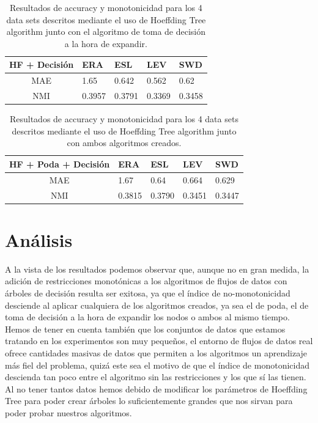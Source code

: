 \begin{table}[H]
	\begin{tabular}{|c|l|l|l|l|}
		\hline
		HF + Decisión & ERA    & ESL    & LEV &  SWD \\ \hline
		MAE & 1.65 & 0.642 & 0.562                      & 0.62                     \\ \hline
		NMI & 0.3957 & 0.3791 & 0.3369                     & 0.3458                     \\ \hline
	\end{tabular}
	\caption{Resultados de accuracy y monotonicidad para los 4 data sets descritos mediante el uso de Hoeffding Tree algorithm junto con el algoritmo de toma de decisión a la hora de expandir.}
\end{table}

\begin{table}[H]
	\begin{tabular}{|c|l|l|l|l|}
		\hline
		HF + Poda + Decisión & ERA    & ESL    & LEV &  SWD \\ \hline
		MAE & 1.67 & 0.64 & 0.664                      & 0.629                     \\ \hline
		NMI & 0.3815 & 0.3790 & 0.3451                     & 0.3447                     \\ \hline
	\end{tabular}
	\caption{Resultados de accuracy y monotonicidad para los 4 data sets descritos mediante el uso de Hoeffding Tree algorithm junto con ambos algoritmos creados.}
\end{table}
\newpage

\section{Análisis}

A la vista de los resultados podemos observar que, aunque no en gran medida, la adición de restricciones monotónicas a los algoritmos de flujos de datos con árboles de decisión resulta ser exitosa, ya que el índice de no-monotonicidad desciende al aplicar cualquiera de los algoritmos creados, ya sea el de poda, el de toma de decisión a la hora de expandir los nodos o ambos al mismo tiempo.\\

Hemos de tener en cuenta también que los conjuntos de datos que estamos tratando en los experimentos son muy pequeños, el entorno de flujos de datos real ofrece cantidades masivas de datos que permiten a los algoritmos un aprendizaje más fiel del problema, quizá este sea el motivo de que el índice de monotonicidad descienda tan poco entre el algoritmo sin las restricciones y los que sí las tienen. Al no tener tantos datos hemos debido de modificar los parámetros de Hoeffding Tree para poder crear árboles lo suficientemente grandes que nos sirvan para poder probar nuestros algoritmos.\\

